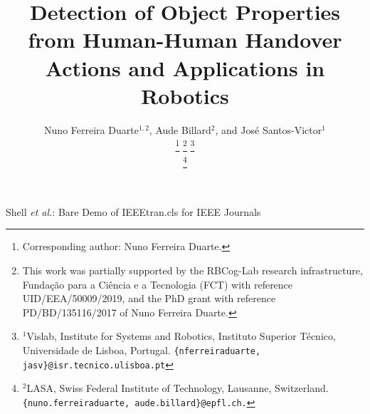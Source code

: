 \documentclass[journal]{IEEEtran}
\begin{document}
%

\title{Detection of Object Properties from Human-Human Handover Actions and Applications in Robotics}
%
\author{Nuno Ferreira Duarte$^{1,2}$, 
        Aude Billard$^2$, and 
        Jos\'{e} Santos-Victor$^{1}$ 
        
\thanks{Corresponding author: Nuno Ferreira Duarte.}
\thanks{This work was partially supported by the RBCog-Lab research infrastructure, Funda\c{c}\~{a}o para a Ci\^{e}ncia e a Tecnologia (FCT) with reference UID/EEA/50009/2019, and the PhD grant with reference PD/BD/135116/2017 of Nuno Ferreira Duarte.}
\thanks{$^{1}$Vislab, Institute for Systems and Robotics, Instituto Superior T\'{e}cnico, Universidade de Lisboa, Portugal.
{\tt\{nferreiraduarte, jasv\}@isr.tecnico.ulisboa.pt}}

\thanks{$^2$LASA, Swiss Federal Institute of Technology, Lausanne, Switzerland. {\tt \{nuno.ferreiraduarte, aude.billard\}@epfl.ch.}}
}

%
{Shell \MakeLowercase{\textit{et al.}}: Bare Demo of IEEEtran.cls for IEEE Journals}
% 



\maketitle
\end{document}
